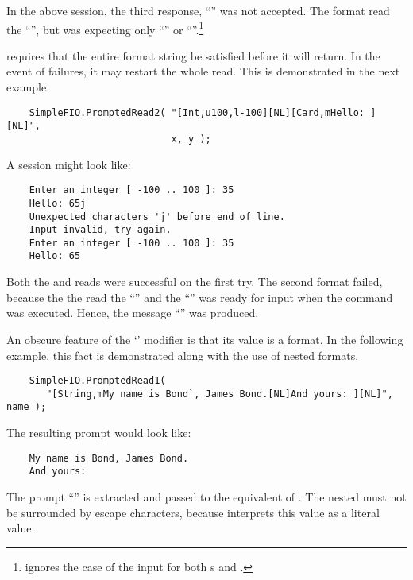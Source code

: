 In the above session, the third response, ``'' was
not accepted.  The  format read the ``'',
but was expecting only ``'' or ``''.\footnote{
    \code{[Bool]} ignores the case of the input for both
    s and .}

 requires that the entire format string be satisfied
before it will return.  In the event of failures, it may restart
the whole read.  This is demonstrated in the next example.
\begin{verbatim}
    SimpleFIO.PromptedRead2( "[Int,u100,l-100][NL][Card,mHello: ][NL]", 
                             x, y );

\end{verbatim}
A session might look like:
\begin{verbatim}
    Enter an integer [ -100 .. 100 ]: 35
    Hello: 65j
    Unexpected characters 'j' before end of line.
    Input invalid, try again.
    Enter an integer [ -100 .. 100 ]: 35
    Hello: 65

\end{verbatim}
Both the \code{[Int]} and \code{[Card]} reads were successful on
the first try.  The second \code{[NL]} format failed, because the 
the \code{[Card]} read the ``'' and the ``'' was ready
for input when the \code{[NL]} command was executed.  Hence, the
message ``'' was
produced.

An obscure feature of the `' modifier is that its value
is a format.  In the following example, this fact is demonstrated
along with the use of nested formats.
\begin{verbatim}
    SimpleFIO.PromptedRead1( 
       "[String,mMy name is Bond`, James Bond.[NL]And yours: ][NL]", name );
\end{verbatim}
The resulting prompt would look like:
\begin{verbatim}
    My name is Bond, James Bond.
    And yours: 
\end{verbatim}
The prompt ``'' is
extracted and passed to the equivalent of .
The nested \code{[NL]} must not be surrounded by escape characters,
because  interprets this value as a literal value.

